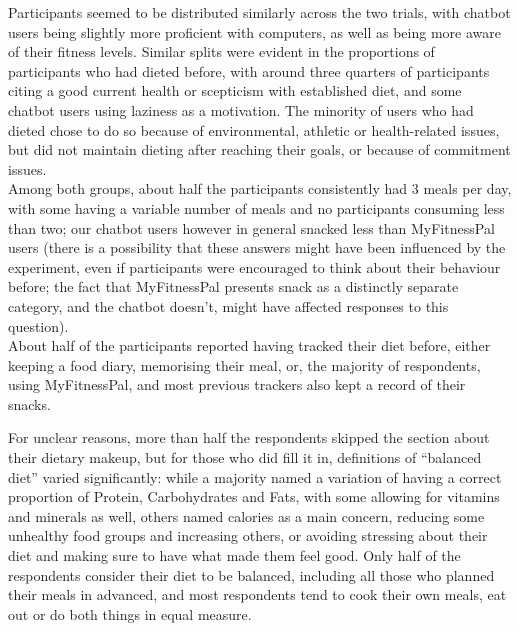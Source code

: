 Participants seemed to be distributed similarly across the two trials, with chatbot users being slightly more proficient with computers, as well as being more aware of their fitness levels. Similar splits were evident in the proportions of participants who had dieted before, with around three quarters of participants citing a good current health or scepticism with established diet, and some chatbot users using laziness as a motivation. The minority of users who had dieted chose to do so because of environmental, athletic or health-related issues, but did not maintain dieting after reaching their goals, or because of commitment issues. \\
Among both groups, about half the participants consistently had 3 meals per day, with some having a variable number of meals and no participants consuming less than two; our chatbot users however in general snacked less than MyFitnessPal users (there is a possibility that these answers might have been influenced by the experiment, even if participants were encouraged to think about their behaviour before; the fact that MyFitnessPal presents snack as a distinctly separate category, and the chatbot doesn't, might have affected responses to this question). \\
About half of the participants reported having tracked their diet before, either keeping a food diary, memorising their meal, or, the majority of respondents, using MyFitnessPal, and most previous trackers also kept a record of their snacks. 

For unclear reasons, more than half the respondents skipped the section about their dietary makeup, but for those who did fill it in, definitions of ``balanced diet'' varied significantly: while a majority named a variation of having a correct proportion of Protein, Carbohydrates and Fats, with some allowing for vitamins and minerals as well, others named calories as a main concern, reducing some unhealthy food groups and increasing others, or avoiding stressing about their diet and making sure to have what made them feel good. Only half of the respondents consider their diet to be balanced, including all those who planned their meals in advanced, and most respondents tend to cook their own meals, eat out or do both things in equal measure.

